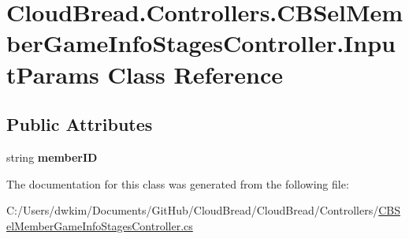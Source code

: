 \hypertarget{class_cloud_bread_1_1_controllers_1_1_c_b_sel_member_game_info_stages_controller_1_1_input_params}{}\section{Cloud\+Bread.\+Controllers.\+C\+B\+Sel\+Member\+Game\+Info\+Stages\+Controller.\+Input\+Params Class Reference}
\label{class_cloud_bread_1_1_controllers_1_1_c_b_sel_member_game_info_stages_controller_1_1_input_params}
\subsection*{Public Attributes}
\begin{DoxyCompactItemize}
\item 
string {\bfseries member\+ID}\hypertarget{class_cloud_bread_1_1_controllers_1_1_c_b_sel_member_game_info_stages_controller_1_1_input_params_a591a11a0c69188fdf44a4aaf9c4d7562}{}\label{class_cloud_bread_1_1_controllers_1_1_c_b_sel_member_game_info_stages_controller_1_1_input_params_a591a11a0c69188fdf44a4aaf9c4d7562}

\end{DoxyCompactItemize}


The documentation for this class was generated from the following file\+:\begin{DoxyCompactItemize}
\item 
C\+:/\+Users/dwkim/\+Documents/\+Git\+Hub/\+Cloud\+Bread/\+Cloud\+Bread/\+Controllers/\hyperlink{_c_b_sel_member_game_info_stages_controller_8cs}{C\+B\+Sel\+Member\+Game\+Info\+Stages\+Controller.\+cs}\end{DoxyCompactItemize}
